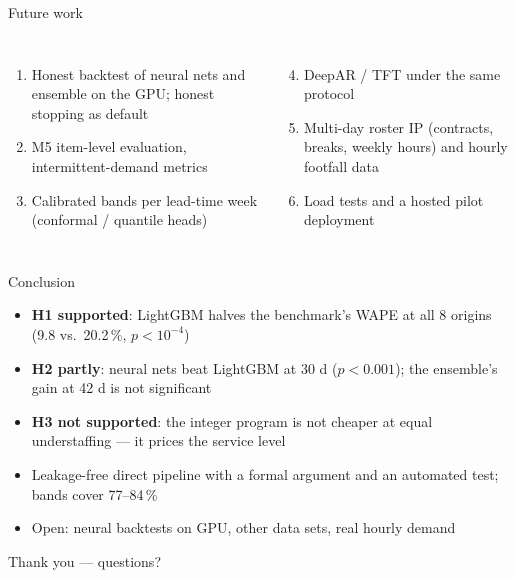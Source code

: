\documentclass[aspectratio=169,11pt]{beamer}
\begin{document}
\begin{frame}{Future work}
\begin{columns}[T]
\begin{enumerate}
  \item Honest backtest of neural nets and ensemble on the GPU; honest stopping as default
  \item M5 item-level evaluation, intermittent-demand metrics
  \item Calibrated bands per lead-time week (conformal / quantile heads)
\end{enumerate}
\begin{enumerate}\setcounter{enumi}{3}
  \item DeepAR / TFT \cite{salinas2020deepar,lim2021tft} under the same protocol
  \item Multi-day roster IP (contracts, breaks, weekly hours) \cite{ernst2004staff} and hourly footfall data
  \item Load tests and a hosted pilot deployment
\end{enumerate}
\end{columns}
\end{frame}

\begin{frame}{Conclusion}
\begin{itemize}
  \item \textbf{H1 supported}: LightGBM halves the benchmark's WAPE at all 8 origins (9.8 vs.\ 20.2\,\%, $p<10^{-4}$)
  \item \textbf{H2 partly}: neural nets beat LightGBM at 30 d ($p<0.001$); the ensemble's gain at 42 d is not significant
  \item \textbf{H3 not supported}: the integer program is not cheaper at equal understaffing --- it prices the service level
  \item Leakage-free direct pipeline with a formal argument and an automated test; bands cover 77--84\,\%
  \item Open: neural backtests on GPU, other data sets, real hourly demand
\end{itemize}
\vfill
\centering\large Thank you --- questions?
\end{frame}
\end{document}
